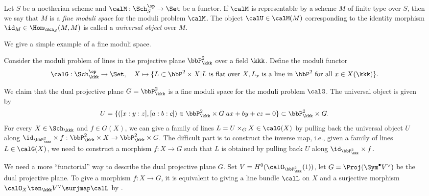     \begin{definition}\label{def:fine_moduli_space}
        Let \(S\) be a noetherian scheme and \(\calM: \Sch_{S}^{\op} \to \Set\) be a functor.
        If \(\calM\) is representable by a scheme \(M\) of finite type over \(S\), then we say that \(M\) is a \emph{fine moduli space} for the moduli problem \(\calM\).
        The object \(\calU \in \calM(M)\) corresponding to the identity morphism \(\id_M \in \Hom_{\Sch_{S}}(M, M)\) is called a \emph{universal object} over \(M\).
    \end{definition}

    We give a simple example of a fine moduli space.

    \begin{example}\label{eg:moduli_of_lines_in_P2}
        Consider the moduli problem of lines in the projective plane \(\bbP_{\kkk}^2\) over a field \(\kkk\).
        Define the moduli functor
        \[
            \calG: \Sch_{\kkk}^{\op} \to \Set,\quad X \mapsto \{L \subset \bbP^2 \times X | L \text{ is flat over } X, L_x \text{ is a line in } \bbP^2 \text{ for all } x \in X(\kkk)\}.
        \]

        We claim that the dual projective plane \(G = \bbP_{\kkk}^2\) is a fine moduli space for the moduli problem \(\calG\).
        The universal object is given by 
        \[
            U = \{([x:y:z], [a:b:c]) \in \bbP_{\kkk}^2 \times G | ax + by + cz = 0\} \subset \bbP_{\kkk}^2 \times G.
        \]
        For every \(X \in \Sch_{\kkk}\) and \(f \in G(X)\), we can give a family of lines \(L = U \times_G X \in \calG(X)\) by pulling back the universal object \(U\) along \(\id_{\bbP_{\kkk}^2} \times f: \bbP_{\kkk}^2 \times X \to \bbP_{\kkk}^2 \times G\).
        The difficult part is to construct the inverse map, i.e., given a family of lines \(L \in \calG(X)\), we need to construct a morphism \(f: X \to G\) such that \(L\) is obtained by pulling back \(U\) along \(\id_{\bbP_{\kkk}^2} \times f\).

        We need a more ``functorial'' way to describe the dual projective plane \(G\).
        Set \(V = H^0(\calO_{\bbP_{\kkk}^2}(1))\), let \(G = \Proj (\Sym^{\bullet} V^{\vee})\) be the dual projective plane.
        To give a morphism \(f:X \to G\), it is equivalent to giving a line bundle \(\calL\) on \(X\) and a surjective morphism \(\calO_X \ten_\kkk V^{\vee} \surjmap \calL\) by .
        

\end{example}
